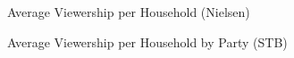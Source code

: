\begin{figure}%
    \centering
    \qquad
    \caption{Average Viewership per Household (Nielsen)}%
    \label{fig:example}%
\end{figure}   






\begin{figure}%
    \centering
    \qquad
    \caption{Average Viewership per Household by Party (STB)}%
    \label{fig:example}%
\end{figure}








